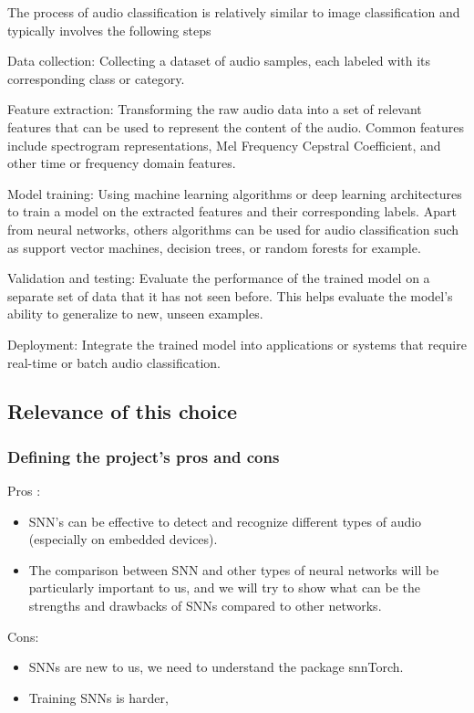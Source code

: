 \documentclass[11pt]{article}
\begin{document}
The process of audio classification is relatively similar to image classification and typically involves the following steps

Data collection: Collecting a dataset of audio samples, each labeled with its corresponding class or category.

Feature extraction: Transforming the raw audio data into a set of relevant features that can be used to represent the content of the audio. Common features include spectrogram representations, Mel Frequency Cepstral Coefficient, and other time or frequency domain features.

Model training: Using machine learning algorithms or deep learning architectures to train a model on the extracted features and their corresponding labels. Apart from neural networks, others algorithms can be used for audio classification such as support vector machines, decision trees, or random forests for example.

Validation and testing: Evaluate the performance of the trained model on a separate set of data that it has not seen before. This helps evaluate the model's ability to generalize to new, unseen examples.

Deployment: Integrate the trained model into applications or systems that require real-time or batch audio classification.

\subsection{Relevance of this choice}
\subsubsection{Defining the project's pros and cons}
Pros :
\begin{itemize}
  \item SNN's can be effective to detect and recognize different types of audio (especially on embedded devices).
  \item The comparison between SNN and other types of neural networks will be particularly important to us, and we will try to show what can be the strengths and drawbacks of SNNs compared to other networks.
\end{itemize}

Cons:

\begin{itemize}
  \item SNNs are new to us, we need to understand the package snnTorch.
  \item Training SNNs is harder,
\end{itemize}
\end{document}
